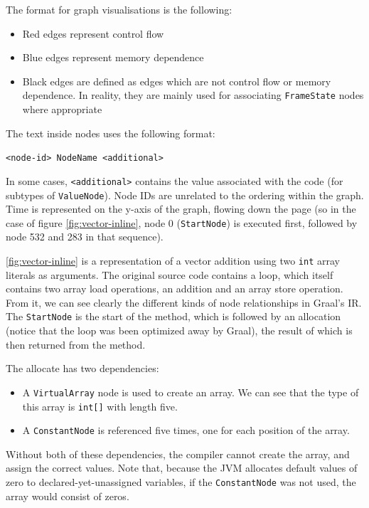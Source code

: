 The format for graph visualisations is the following:
\begin{itemize}
	\item Red edges represent control flow
	\item Blue edges represent memory dependence
	\item Black edges are defined as edges which are not control flow or memory dependence. In reality, they are mainly used for associating \texttt{FrameState} nodes where appropriate
\end{itemize}

The text inside nodes uses the following format:

\texttt{<node-id> NodeName <additional>}

In some cases, \texttt{<additional>} contains the value associated with the code (for subtypes of \texttt{ValueNode}). Node IDs are unrelated to the ordering within the graph. Time is represented on the y-axis of the graph, flowing down the page (so in the case of figure \ref{fig:vector-inline}, node 0 (\texttt{StartNode}) is executed first, followed by node 532 and 283 in that sequence).

\autoref{fig:vector-inline} is a representation of a vector addition using two \texttt{int} array literals as arguments. The original source code contains a loop, which itself contains two array load operations, an addition and an array store operation. From it, we can see clearly the different kinds of node relationships in Graal's IR. The \texttt{StartNode} is the start of the method, which is followed by an allocation (notice that the loop was been optimized away by Graal), the result of which is then returned from the method.

The allocate has two dependencies:

\begin{itemize}
	\item A \texttt{VirtualArray} node is used to create an array. We can see that the type of this array is \texttt{int[]} with length five.
	
	\item A \texttt{ConstantNode} is referenced five times, one for each position of the array.
\end{itemize}

Without both of these dependencies, the compiler cannot create the array, and assign the correct values. Note that, because the JVM allocates default values of zero to declared-yet-unassigned variables, if the \texttt{ConstantNode} was not used, the array would consist of zeros.

